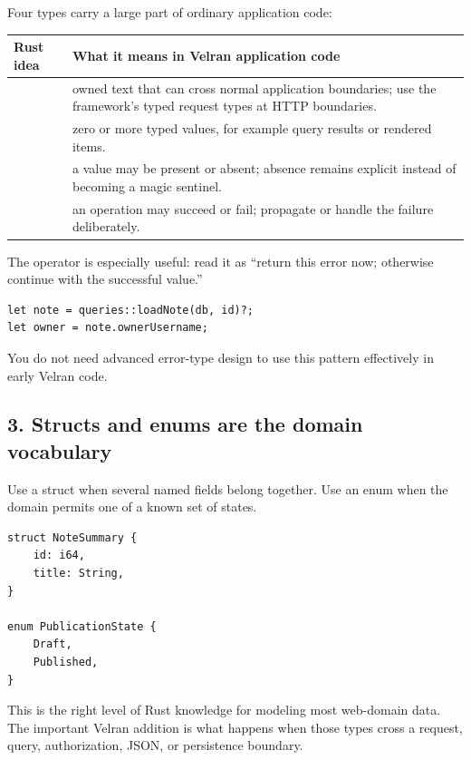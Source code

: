 Four types carry a large part of ordinary application code:

\begin{center}
\begin{tabularx}{\textwidth}{@{}L{0.20\textwidth} Y@{}}
\toprule
\textbf{Rust idea} & \textbf{What it means in Velran application code} \\
\midrule
{} & owned text that can cross normal application boundaries; use the framework's typed request types at HTTP boundaries. \\
 & zero or more typed values, for example query results or rendered items. \\
 & a value may be present or absent; absence remains explicit instead of becoming a magic sentinel. \\
 & an operation may succeed or fail; propagate or handle the failure deliberately. \\
\bottomrule
\end{tabularx}
\end{center}

The  operator is especially useful: read it as ``return this error now; otherwise continue with the successful value.''

\begin{lstlisting}[language=Velran]
let note = queries::loadNote(db, id)?;
let owner = note.ownerUsername;
\end{lstlisting}

You do not need advanced error-type design to use this pattern effectively in early Velran code.

\subsection*{3. Structs and enums are the domain vocabulary}

Use a struct when several named fields belong together. Use an enum when the domain permits one of a known set of states.

\begin{lstlisting}[language=Velran]
struct NoteSummary {
    id: i64,
    title: String,
}

enum PublicationState {
    Draft,
    Published,
}
\end{lstlisting}

This is the right level of Rust knowledge for modeling most web-domain data. The important Velran addition is what happens when those types cross a request, query, authorization, JSON, or persistence boundary.

